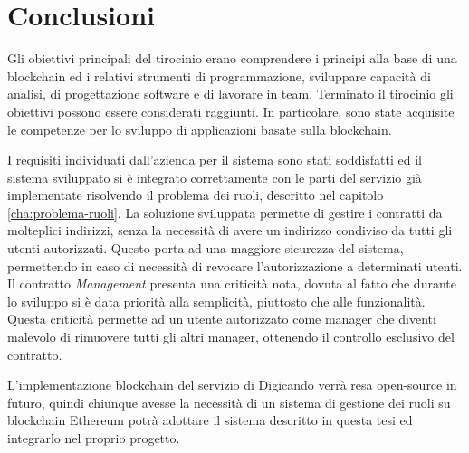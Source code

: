 \chapter{Conclusioni}
\label{cha:conclusioni}
Gli obiettivi principali del tirocinio erano comprendere i principi alla base di una blockchain ed i relativi strumenti di programmazione, sviluppare capacità di analisi, di progettazione software e di lavorare in team. Terminato il tirocinio gli obiettivi possono essere considerati raggiunti. In particolare, sono state acquisite le competenze per lo sviluppo di applicazioni basate sulla blockchain.

I requisiti individuati dall'azienda per il sistema sono stati soddisfatti ed il sistema sviluppato si è integrato correttamente con le parti del servizio già implementate risolvendo il problema dei ruoli, descritto nel capitolo \ref{cha:problema-ruoli}. La soluzione sviluppata permette di gestire i contratti da molteplici indirizzi, senza la necessità di avere un indirizzo condiviso da tutti gli utenti autorizzati. Questo porta ad una maggiore sicurezza del sistema, permettendo in caso di necessità di revocare l'autorizzazione a determinati utenti.
Il contratto \emph{Management} presenta una criticità nota, dovuta al fatto che durante lo sviluppo si è data priorità alla semplicità, piuttosto che alle funzionalità. Questa criticità permette ad un utente autorizzato come manager che diventi malevolo di rimuovere tutti gli altri manager, ottenendo il controllo esclusivo del contratto.

L'implementazione blockchain del servizio di Digicando verrà resa open-source in futuro, quindi chiunque avesse la necessità di un sistema di gestione dei ruoli su blockchain Ethereum potrà adottare il sistema descritto in questa tesi ed integrarlo nel proprio progetto.